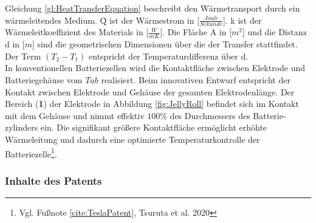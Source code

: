Gleichung \ref{gl:HeatTransferEquation} beschreibt den Wärmetransport durch ein wärmeleitendes Medium. \.{Q} ist der Wärmestrom in [\textbf{$\frac{Joule}{Sekunde}$}]. k ist der Wärmeleitkoeffizient des Materials in [\textbf{$\frac{W}{mK}$}].
Die Fläche A in [\textbf{$m^{2}$}] und die Distanz d in [\textbf{$m$}] sind die geometrischen Dimensionen über die der Transfer stattfindet. Der Term $(T_{2}-T_{1})$ entspricht der Temperaturdifferenz über d.\\
In konventionellen Batteriezellen wird die Kontaktfläche zwischen Elektrode und Batteriegehäuse vom $Tab$ realisiert. Beim innovativen Entwurf entspricht der Kontakt zwischen Elektrode und Gehäuse der gesamten Elektrodenlänge. Der Bereich (\textbf{1}) der Elektrode in Abbildung \ref{fig:JellyRoll} befindet sich im Kontakt mit dem Gehäuse und nimmt effektiv $100\percent$ des Durchmessers des Batterie-\newline zylinders ein. Die signifikant größere Kontaktfläche ermöglicht erhöhte Wärmeleitung und dadurch eine optimierte Temperaturkontrolle der Batteriezelle\footnote{Vgl. Fußnote \ref{cite:TeslaPatent}, Tsuruta et al. 2020}.\\

\subsubsection*{Inhalte des Patents}\label{subsub:PatentContents}

